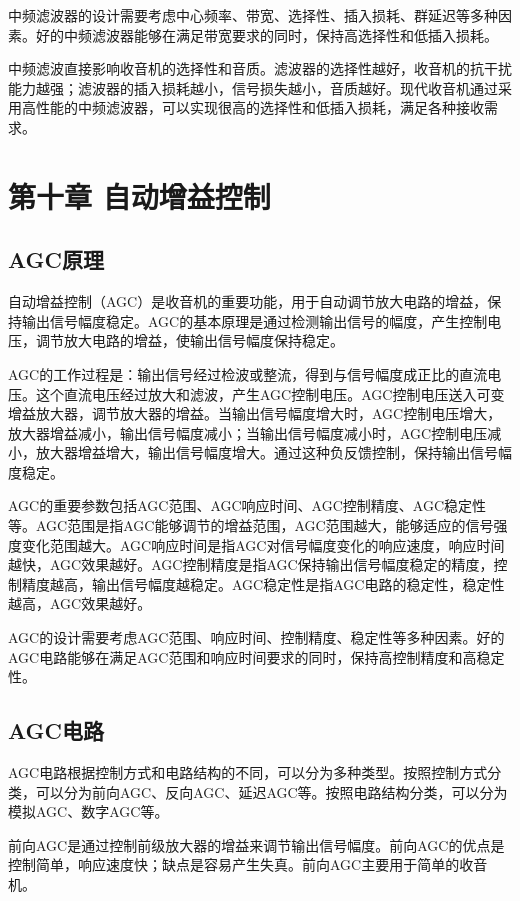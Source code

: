 \documentclass[12pt,UTF8]{ctexbook}
\begin{document}
中频滤波器的设计需要考虑中心频率、带宽、选择性、插入损耗、群延迟等多种因素。好的中频滤波器能够在满足带宽要求的同时，保持高选择性和低插入损耗。

中频滤波直接影响收音机的选择性和音质。滤波器的选择性越好，收音机的抗干扰能力越强；滤波器的插入损耗越小，信号损失越小，音质越好。现代收音机通过采用高性能的中频滤波器，可以实现很高的选择性和低插入损耗，满足各种接收需求。

\chapter{第十章 自动增益控制}

\section{AGC原理}

自动增益控制（AGC）是收音机的重要功能，用于自动调节放大电路的增益，保持输出信号幅度稳定。AGC的基本原理是通过检测输出信号的幅度，产生控制电压，调节放大电路的增益，使输出信号幅度保持稳定。

AGC的工作过程是：输出信号经过检波或整流，得到与信号幅度成正比的直流电压。这个直流电压经过放大和滤波，产生AGC控制电压。AGC控制电压送入可变增益放大器，调节放大器的增益。当输出信号幅度增大时，AGC控制电压增大，放大器增益减小，输出信号幅度减小；当输出信号幅度减小时，AGC控制电压减小，放大器增益增大，输出信号幅度增大。通过这种负反馈控制，保持输出信号幅度稳定。

AGC的重要参数包括AGC范围、AGC响应时间、AGC控制精度、AGC稳定性等。AGC范围是指AGC能够调节的增益范围，AGC范围越大，能够适应的信号强度变化范围越大。AGC响应时间是指AGC对信号幅度变化的响应速度，响应时间越快，AGC效果越好。AGC控制精度是指AGC保持输出信号幅度稳定的精度，控制精度越高，输出信号幅度越稳定。AGC稳定性是指AGC电路的稳定性，稳定性越高，AGC效果越好。

AGC的设计需要考虑AGC范围、响应时间、控制精度、稳定性等多种因素。好的AGC电路能够在满足AGC范围和响应时间要求的同时，保持高控制精度和高稳定性。

\section{AGC电路}

AGC电路根据控制方式和电路结构的不同，可以分为多种类型。按照控制方式分类，可以分为前向AGC、反向AGC、延迟AGC等。按照电路结构分类，可以分为模拟AGC、数字AGC等。

前向AGC是通过控制前级放大器的增益来调节输出信号幅度。前向AGC的优点是控制简单，响应速度快；缺点是容易产生失真。前向AGC主要用于简单的收音机。
\end{document}
